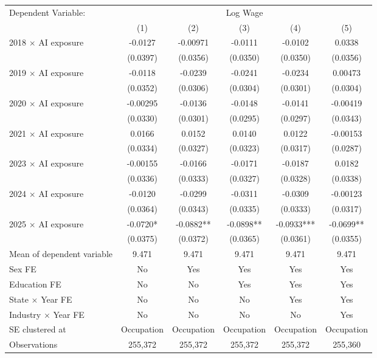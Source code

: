 \def\sym#1{\ifmmode^{#1}\else\(^{#1}\)\fi}
\begin{tabular}{l*{5}{c}}
\toprule
Dependent Variable: & \multicolumn{5}{c}{Log Wage} \\
\cmidrule(lr){2-6}
 & (1) & (2) & (3) & (4) & (5) \\
\midrule
2018 $\times$ AI exposure&     -0.0127   &    -0.00971   &     -0.0111   &     -0.0102   &      0.0338   \\
            &    (0.0397)   &    (0.0356)   &    (0.0350)   &    (0.0350)   &    (0.0356)   \\
2019 $\times$ AI exposure&     -0.0118   &     -0.0239   &     -0.0241   &     -0.0234   &     0.00473   \\
            &    (0.0352)   &    (0.0306)   &    (0.0304)   &    (0.0301)   &    (0.0304)   \\
2020 $\times$ AI exposure&    -0.00295   &     -0.0136   &     -0.0148   &     -0.0141   &    -0.00419   \\
            &    (0.0330)   &    (0.0301)   &    (0.0295)   &    (0.0297)   &    (0.0343)   \\
2021 $\times$ AI exposure&      0.0166   &      0.0152   &      0.0140   &      0.0122   &    -0.00153   \\
            &    (0.0334)   &    (0.0327)   &    (0.0323)   &    (0.0317)   &    (0.0287)   \\
2023 $\times$ AI exposure&    -0.00155   &     -0.0166   &     -0.0171   &     -0.0187   &      0.0182   \\
            &    (0.0336)   &    (0.0333)   &    (0.0327)   &    (0.0328)   &    (0.0338)   \\
2024 $\times$ AI exposure&     -0.0120   &     -0.0299   &     -0.0311   &     -0.0309   &    -0.00123   \\
            &    (0.0364)   &    (0.0343)   &    (0.0335)   &    (0.0333)   &    (0.0317)   \\
2025 $\times$ AI exposure&     -0.0720*  &     -0.0882** &     -0.0898** &     -0.0933***&     -0.0699** \\
            &    (0.0375)   &    (0.0372)   &    (0.0365)   &    (0.0361)   &    (0.0355)   \\
\midrule
Mean of dependent variable&       9.471   &       9.471   &       9.471   &       9.471   &       9.471   \\
Sex FE      &          No   &         Yes   &         Yes   &         Yes   &         Yes   \\
Education FE&          No   &          No   &         Yes   &         Yes   &         Yes   \\
State $\times$ Year FE&          No   &          No   &          No   &         Yes   &         Yes   \\
Industry $\times$ Year FE&          No   &          No   &          No   &          No   &         Yes   \\
SE clustered at&  Occupation   &  Occupation   &  Occupation   &  Occupation   &  Occupation   \\
Observations&     255,372   &     255,372   &     255,372   &     255,372   &     255,360   \\
\bottomrule
\end{tabular}
